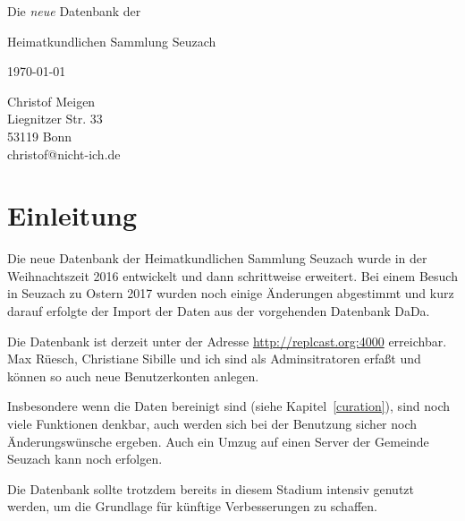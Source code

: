 \documentclass[12pt]{scrreprt}
\begin{document}
\def\DB{Datenbank der Heimatkundlichen Sammlung Seuzach}
\def\RB#1{{\color{red} \textsf{\textbf{#1}}}}
\strut
\thispagestyle{empty}
\vfill


\begin{center}
  
{\Huge Die \textit{neue} Datenbank der

  \medskip
  
Heimatkundlichen Sammlung Seuzach}

\bigskip


\bigskip

\today
\end{center}


\vfill

\hfill \begin{minipage}{5cm}
  Christof Meigen\\
  Liegnitzer Str. 33 \\
53119 Bonn \\
christof@nicht-ich.de
\end{minipage}

\clearpage

\tableofcontents

\clearpage

\chapter{Einleitung}

Die neue Datenbank der Heimatkundlichen Sammlung Seuzach wurde in der Weihnachtszeit 2016
entwickelt und dann schrittweise erweitert. Bei einem Besuch in Seuzach zu Ostern 2017
wurden noch einige Änderungen abgestimmt und kurz darauf erfolgte der Import der Daten aus
der vorgehenden Datenbank DaDa.

Die Datenbank ist derzeit unter der Adresse
\url{http://replcast.org:4000} erreichbar.  Max Rüesch, Christiane
Sibille und ich sind als Adminsitratoren erfaßt und können so auch
neue Benutzerkonten anlegen.

Insbesondere wenn die Daten bereinigt sind (siehe
Kapitel~\ref{curation}), sind noch viele Funktionen denkbar, auch
werden sich bei der Benutzung sicher noch Änderungswünsche
ergeben. Auch ein Umzug auf einen Server der Gemeinde Seuzach kann
noch erfolgen.

Die Datenbank sollte trotzdem bereits in diesem Stadium intensiv genutzt werden,
um die Grundlage für künftige Verbesserungen zu schaffen.
\end{document}
